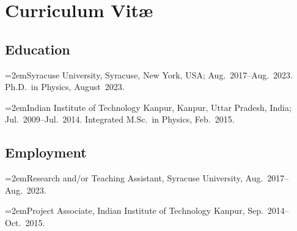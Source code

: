 
\chapter*{Curriculum Vit\ae}
\thispagestyle{empty}

\def\hangpar{\noindent\hangindent=2em}

\section*{Education}

\hangpar Syracuse University, Syracuse, New York, USA; Aug.~2017--Aug.~2023.\\
Ph.D.~in Physics, August~2023.

\hangpar Indian Institute of Technology Kanpur, Kanpur, Uttar Pradesh, India; Jul.~2009--Jul.~2014. Integrated M.Sc.~in Physics, Feb.~2015.

\section*{Employment}

\hangpar Research and/or Teaching Assistant, Syracuse University, Aug.~2017--Aug.~2023.

\hangpar Project Associate, Indian Institute of Technology Kanpur, Sep.~2014--Oct.~2015.
